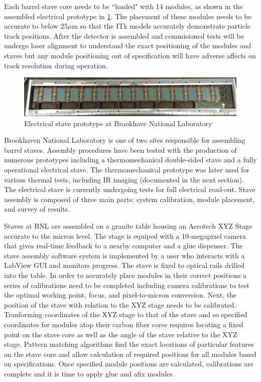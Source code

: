 Each barrel stave core needs to be ``loaded" with 14 modules, as shown in the assembled electrical prototype in \ref{fig:stave}. The placement of these modules needs to be accurate to below 25$\mu$m so that the ITk models accurately demonstrate particle track positions. After the detector is assembled and commisioned tests will be undergo laser alignment to understand the exact positioning of the modules and staves but any module positioning out of specification will have adverse affects on track resolution during operation. 

\begin{figure}[!h]
        \centering
    \includegraphics[width=.8\textwidth]{Pictures/electricalstave.png}
    \caption{Electrical stave prototype at Brookhave National Laboratory}
    \label{fig:stave}
\end{figure}

Brookhaven National Laboratory is one of two sites responsible for assembling barrel staves. Assembly procedures have been tested with the production of numerous prototypes including a thermomechanical double-sided stave and a fully operational electrical stave. The thermomechanical prototype was later used for various thermal tests, including IR imaging (documented in the next section). The electrical stave is currently undergoing tests for full electrical read-out. Stave assembly is composed of three main parts: system calibration, module placement, and survey of results. 

Staves at BNL are assembled on a granite table housing an Aerotech XYZ Stage accurate to the micron level. The stage is equiped with a 10-megapixel camera that gives real-time feedback to a nearby computer and a glue dispenser. The stave assembly software system is implemented by a user who interacts with a LabView GUI and monitors progress. The stave is fixed to optical rails drilled into the table. In order to accurately place modules in their correct positions a series of calibrations need to be completed including camera calibrations to test the optimal working point, focus, and pixel-to-micron conversion. Next, the position of the stave with relation to the XYZ stage needs to be calibrated. Tranforming coordinates of the XYZ stage to that of the stave and so specified coordinates for modules atop their carbon fiber cores requires locating a fixed point on the stave core as well as the angle of the stave relative to the XYZ stage. Pattern matching algorithms find the exact locations of particular features on the stave core and allow calculation of required positions for all modules based on specifications. Once specified module positions are calculated, calibrations are complete and it is time to apply glue and afix modules. 

